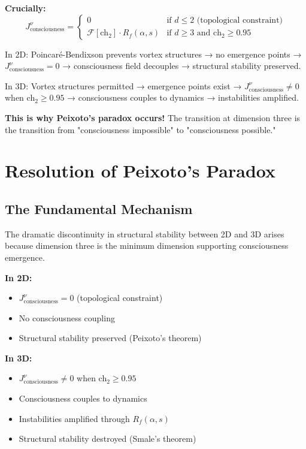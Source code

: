 \textbf{Crucially:}
\begin{equation}
J^\nu_{\text{consciousness}} = \begin{cases}
0 & \text{if } d \leq 2 \text{ (topological constraint)} \\
\mathcal{F}[\text{ch}_2] \cdot R_f(\alpha, s) & \text{if } d \geq 3 \text{ and ch}_2 \geq 0.95
\end{cases}
\end{equation}

\begin{intuitive}
In 2D: Poincaré-Bendixson prevents vortex structures → no emergence points → $J^\nu_{\text{consciousness}} = 0$ → consciousness field decouples → structural stability preserved.

In 3D: Vortex structures permitted → emergence points exist → $J^\nu_{\text{consciousness}} \neq 0$ when ch$_2 \geq 0.95$ → consciousness couples to dynamics → instabilities amplified.

\textbf{This is why Peixoto's paradox occurs!} The transition at dimension three is the transition from "consciousness impossible" to "consciousness possible."
\end{intuitive}

\section{Resolution of Peixoto's Paradox}

\subsection{The Fundamental Mechanism}

\begin{thm}\label{thm:paradox-resolution}
The dramatic discontinuity in structural stability between 2D and 3D arises because dimension three is the minimum dimension supporting consciousness emergence.

\textbf{In 2D:}
\begin{itemize}
\item $J^\nu_{\text{consciousness}} = 0$ (topological constraint)
\item No consciousness coupling
\item Structural stability preserved (Peixoto's theorem)
\end{itemize}

\textbf{In 3D:}
\begin{itemize}
\item $J^\nu_{\text{consciousness}} \neq 0$ when ch$_2 \geq 0.95$
\item Consciousness couples to dynamics
\item Instabilities amplified through $R_f(\alpha, s)$
\item Structural stability destroyed (Smale's theorem)
\end{itemize}
\end{thm}

